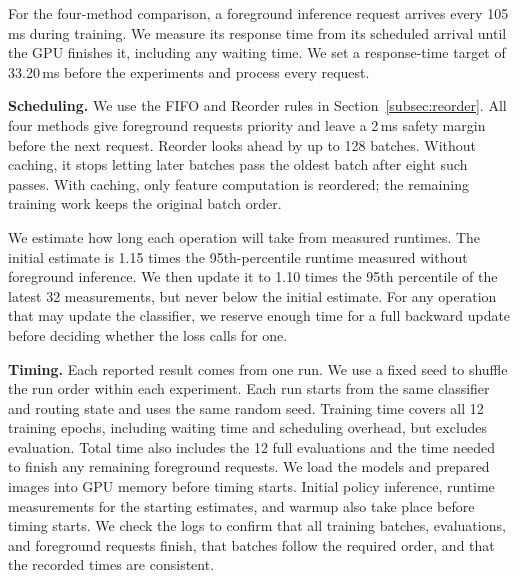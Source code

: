 For the four-method comparison, a foreground inference request arrives every 105\,ms during training.
We measure its response time from its scheduled arrival until the GPU finishes it, including any waiting time.
We set a response-time target of 33.20\,ms before the experiments and process every request.

\noindent \textbf{Scheduling.}
We use the FIFO and Reorder rules in Section~\ref{subsec:reorder}.
All four methods give foreground requests priority and leave a 2\,ms safety margin before the next request.
Reorder looks ahead by up to 128 batches.
Without caching, it stops letting later batches pass the oldest batch after eight such passes.
With caching, only feature computation is reordered; the remaining training work keeps the original batch order.

We estimate how long each operation will take from measured runtimes.
The initial estimate is 1.15 times the 95th-percentile runtime measured without foreground inference.
We then update it to 1.10 times the 95th percentile of the latest 32 measurements, but never below the initial estimate.
For any operation that may update the classifier, we reserve enough time for a full backward update before deciding whether the loss calls for one.

\noindent \textbf{Timing.}
Each reported result comes from one run.
We use a fixed seed to shuffle the run order within each experiment.
Each run starts from the same classifier and routing state and uses the same random seed.
Training time covers all 12 training epochs, including waiting time and scheduling overhead, but excludes evaluation.
Total time also includes the 12 full evaluations and the time needed to finish any remaining foreground requests.
We load the models and prepared images into GPU memory before timing starts.
Initial policy inference, runtime measurements for the starting estimates, and warmup also take place before timing starts.
We check the logs to confirm that all training batches, evaluations, and foreground requests finish, that batches follow the required order, and that the recorded times are consistent.
\par
\endgroup
